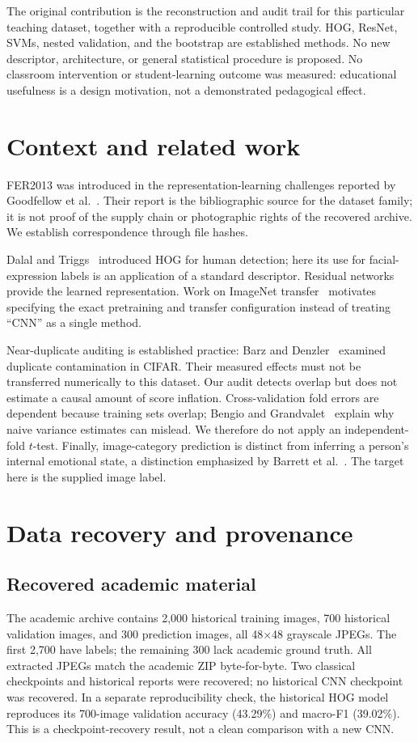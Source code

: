 \documentclass[11pt,a4paper]{article}
\begin{document}
The original contribution is the reconstruction and audit trail for this
particular teaching dataset, together with a reproducible controlled study.
HOG, ResNet, SVMs, nested validation, and the bootstrap are established methods.
No new descriptor, architecture, or general statistical procedure is proposed.
No classroom intervention or student-learning outcome was measured: educational
usefulness is a design motivation, not a demonstrated pedagogical effect.

\section{Context and related work}
FER2013 was introduced in the representation-learning challenges reported by
Goodfellow et al.~\cite{fer}. Their report is the bibliographic source for the
dataset family; it is not proof of the supply chain or photographic rights of
the recovered archive. We establish correspondence through file hashes.

Dalal and Triggs~\cite{hog} introduced HOG for human detection; here its use for
facial-expression labels is an application of a standard descriptor. Residual
networks~\cite{resnet} provide the learned representation. Work on ImageNet
transfer~\cite{transfer} motivates specifying the exact pretraining and transfer
configuration instead of treating ``CNN'' as a single method.

Near-duplicate auditing is established practice: Barz and Denzler~\cite{duplicates}
examined duplicate contamination in CIFAR. Their measured effects must not be
transferred numerically to this dataset. Our audit detects overlap but does not
estimate a causal amount of score inflation. Cross-validation fold errors are
dependent because training sets overlap; Bengio and Grandvalet~\cite{cvvariance}
explain why naive variance estimates can mislead. We therefore do not apply an
independent-fold $t$-test. Finally, image-category prediction is distinct from
inferring a person's internal emotional state, a distinction emphasized by
Barrett et al.~\cite{emotion}. The target here is the supplied image label.

\section{Data recovery and provenance}
\subsection{Recovered academic material}
The academic archive contains 2,000 historical training images, 700 historical
validation images, and 300 prediction images, all 48$\times$48 grayscale JPEGs.
The first 2,700 have labels; the remaining 300 lack academic ground truth.
All extracted JPEGs match the academic ZIP byte-for-byte. Two classical
checkpoints and historical reports were recovered; no historical CNN checkpoint
was recovered. In a separate reproducibility check, the historical HOG model
reproduces its 700-image validation accuracy (43.29\%) and macro-F1 (39.02\%).
This is a checkpoint-recovery result, not a clean comparison with a new CNN.
\end{document}
